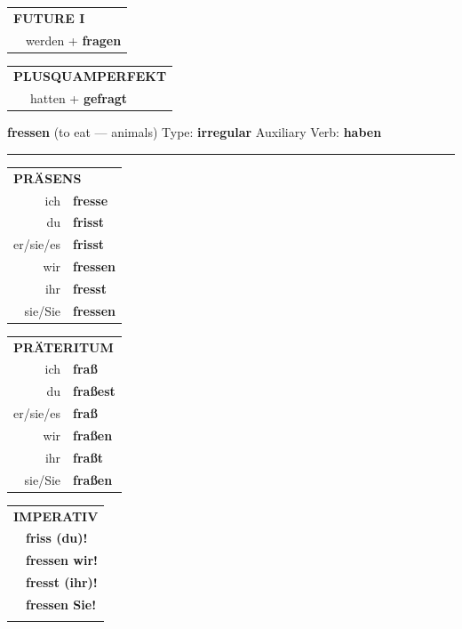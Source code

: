 \documentclass[10pt,a4paper]{revtex4-2}
\begin{document}
\begin{verbbox-acc}
\begin{tabular}{rl}
    \multicolumn{2}{l}{\textbf{FUTURE I} }\\
   & werden + \textbf{fragen}\\
 
  \end{tabular}
\hfill
   \begin{tabular}{rl}
      \multicolumn{2}{l}{\textbf{PLUSQUAMPERFEKT}}\\
   & hatten + \textbf{gefragt}\\
  \end{tabular}
  
  \vspace{-5pt}


\end{verbbox-acc}

\begin{verbbox}
    {\Large \bf fressen} (to eat — animals) \hfill Type: \textbf{irregular} \hfill Auxiliary Verb: \textbf{haben} 
    
     \vspace{5pt}

    \hrule
    
    \vspace{5pt}

  \begin{tabular}{rl}
     \multicolumn{2}{l}{\textbf{PRÄSENS} }\\
    ich & \textbf{fresse}\\
    du & \textbf{frisst}\\
    er/sie/es & \textbf{frisst}\\
    wir & \textbf{fressen}\\
    ihr & \textbf{fresst}\\
    sie/Sie & \textbf{fressen}\\
  \end{tabular}
  \hfill
     \begin{tabular}{rl}
    \multicolumn{2}{l}{\textbf{PRÄTERITUM} }\\
    ich & \textbf{fraß}\\
    du & \textbf{fraßest}\\
    er/sie/es & \textbf{fraß}\\
    wir & \textbf{fraßen}\\
    ihr & \textbf{fraßt}\\
    sie/Sie & \textbf{fraßen}\\
  \end{tabular}
  \hfill
  \begin{tabular}{rl}
     \multicolumn{2}{l}{\textbf{IMPERATIV} }\\
   & \textbf{friss (du)!}\\
   & \textbf{fressen wir!}\\
   & \textbf{fresst (ihr)!}\\
   & \textbf{fressen Sie!}\\
   & \vspace{10pt}
  \end{tabular}


\end{verbbox}
\end{document}
